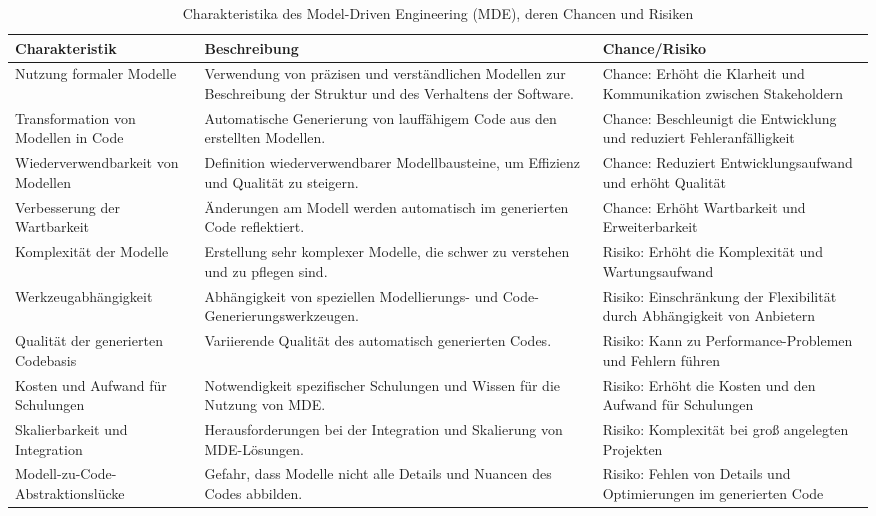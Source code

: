 \begin{table}[h!]
    \centering
    \begin{tabular}{|p{4cm}|p{6cm}|p{4cm}|}
    \hline
    \textbf{Charakteristik} & \textbf{Beschreibung} & \textbf{Chance/Risiko} \\
    \hline
    Nutzung formaler Modelle & Verwendung von präzisen und verständlichen Modellen zur Beschreibung der Struktur und des Verhaltens der Software. & Chance: Erhöht die Klarheit und Kommunikation zwischen Stakeholdern \\
    \hline
    Transformation von Modellen in Code & Automatische Generierung von lauffähigem Code aus den erstellten Modellen. & Chance: Beschleunigt die Entwicklung und reduziert Fehleranfälligkeit \\
    \hline
    Wiederverwendbarkeit von Modellen & Definition wiederverwendbarer Modellbausteine, um Effizienz und Qualität zu steigern. & Chance: Reduziert Entwicklungsaufwand und erhöht Qualität \\
    \hline
    Verbesserung der Wartbarkeit & Änderungen am Modell werden automatisch im generierten Code reflektiert. & Chance: Erhöht Wartbarkeit und Erweiterbarkeit \\
    \hline
    Komplexität der Modelle & Erstellung sehr komplexer Modelle, die schwer zu verstehen und zu pflegen sind. & Risiko: Erhöht die Komplexität und Wartungsaufwand \\
    \hline
    Werkzeugabhängigkeit & Abhängigkeit von speziellen Modellierungs- und Code-Generierungswerkzeugen. & Risiko: Einschränkung der Flexibilität durch Abhängigkeit von Anbietern \\
    \hline
    Qualität der generierten Codebasis & Variierende Qualität des automatisch generierten Codes. & Risiko: Kann zu Performance-Problemen und Fehlern führen \\
    \hline
    Kosten und Aufwand für Schulungen & Notwendigkeit spezifischer Schulungen und Wissen für die Nutzung von MDE. & Risiko: Erhöht die Kosten und den Aufwand für Schulungen \\
    \hline
    Skalierbarkeit und Integration & Herausforderungen bei der Integration und Skalierung von MDE-Lösungen. & Risiko: Komplexität bei groß angelegten Projekten \\
    \hline
    Modell-zu-Code-Abstraktionslücke & Gefahr, dass Modelle nicht alle Details und Nuancen des Codes abbilden. & Risiko: Fehlen von Details und Optimierungen im generierten Code \\
    \hline
    \end{tabular}
    \caption{Charakteristika des Model-Driven Engineering (MDE), deren Chancen und Risiken \cite{Schmidt_2006, brambilla2017model, Selic_2003, steinberg2008emf, France_2007}}
    \label{tab:mde_characteristics}
\end{table}


